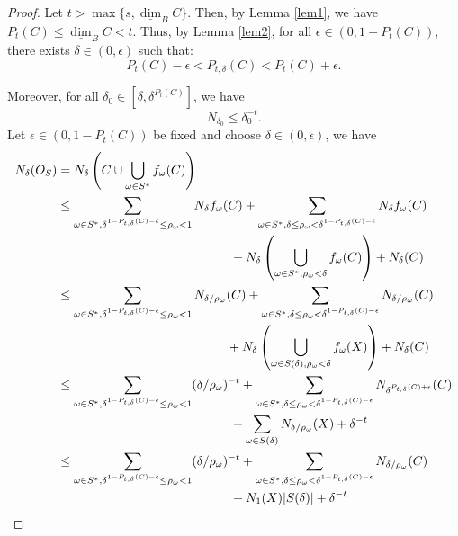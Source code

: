 \documentclass[12pt,oneside,reqno]{amsart}
\theoremstyle{definition}
\theoremstyle{remark}
\begin{document}
\begin{proof}
    Let \(t > \max\{s, \underline{\dim}_B C\}\). Then, by Lemma \ref{lem1}, we have \(P_t(C) \le \underline{\dim}_B C < t\). Thus, by Lemma \ref{lem2}, for all \(\epsilon \in (0, 1 - P_t(C))\), there exists \(\delta \in (0, \epsilon)\) such that:
   $$ P_t(C) - \epsilon < P_{t, \delta}(C) < P_t(C) + \epsilon.$$
    
    Moreover, for all \(\delta_0 \in [\delta, \delta^{P_t(C)}]\), we have
    \[
    N_{\delta_0} \le \delta_0^{-t}.
    \]
Let $\epsilon \in (0, 1 - P_t(C))$ be fixed and choose $\delta \in (0, \epsilon)$, we have
\[
\begin{aligned}
    N_{\delta}(O_S) &= N_{\delta}\left(C \cup \bigcup_{\omega \in S^*} f_\omega(C)\right) \\
    &\le \sum_{\omega \in S^*, \delta^{1 - P_{t, \delta}(C) - \epsilon} \le \rho_\omega < 1} N_{\delta} f_\omega(C) + \sum_{\omega \in S^*, \delta \le \rho_\omega < \delta^{1 - P_{t, \delta}(C) - \epsilon}} N_{\delta} f_\omega(C) \\
    &\quad \hspace{4.5cm}+ N_{\delta} \left(\bigcup_{\omega \in S^*, \rho_\omega < \delta} f_\omega(C)\right) + N_{\delta}(C) \\
    &\le \sum_{\omega \in S^*, \delta^{1 - P_{t, \delta}(C) - \epsilon} \le \rho_\omega < 1} N_{\delta / \rho_\omega}(C) + \sum_{\omega \in S^*, \delta \le \rho_\omega < \delta^{1 - P_{t, \delta}(C) - \epsilon}} N_{\delta / \rho_\omega}(C) \\
    &\quad \hspace{4.4cm}+ N_{\delta} \left( \bigcup_{\omega \in S(\delta), \rho_\omega < \delta} f_\omega(X) \right) + N_{\delta}(C) \\
    &\le \sum_{\omega \in S^*, \delta^{1 - P_{t, \delta}(C) - \epsilon} \le \rho_\omega < 1} (\delta / \rho_\omega)^{-t} + \sum_{\omega \in S^*, \delta \le \rho_\omega < \delta^{1 - P_{t, \delta}(C) - \epsilon}} N_{\delta^{P_{t, \delta}(C) + \epsilon}}(C) \\
    &\quad \hspace{4.5cm}+ \sum_{\omega \in S(\delta)} N_{\delta / \rho_\omega}(X) + \delta^{-t} \\
    &\le \sum_{\omega \in S^*, \delta^{1 - P_{t, \delta}(C) - \epsilon} \le \rho_\omega < 1} (\delta / \rho_\omega)^{-t} + \sum_{\omega \in S^*, \delta \le \rho_\omega < \delta^{1 - P_{t, \delta}(C) - \epsilon}} N_{\delta / \rho_\omega}(C) \\
    &\quad \hspace{4.5cm}+ N_1(X) |S(\delta)| + \delta^{-t} \\

\end{aligned}\]
\end{proof}
\end{document}
